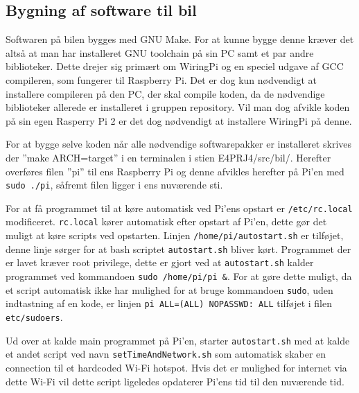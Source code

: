 \subsection{Bygning af software til bil}

Softwaren på bilen bygges med GNU Make\cite{lib:GNU_make}.
For at kunne bygge denne kræver det altså at man har installeret GNU toolchain på sin PC samt et par andre biblioteker.
Dette drejer sig primært om WiringPi\cite{lib:wiringpi} og en speciel udgave af GCC compileren, som fungerer til Raspberry Pi\cite{lib:pi_tools}.
Det er dog kun nødvendigt at installere compileren på den PC, der skal compile koden, da de nødvendige biblioteker allerede er installeret i gruppen repository. 
Vil man dog afvikle koden på sin egen Rasperry Pi 2 er det dog nødvendigt at installere WiringPi på denne.

For at bygge selve koden når alle nødvendige softwarepakker er installeret skrives der ''make ARCH=target'' i en terminalen i stien E4PRJ4/src/bil/.
Herefter overføres filen ''pi'' til ens Raspberry Pi og denne afvikles herefter på Pi'en med \texttt{sudo ./pi}, såfremt filen ligger i ens nuværende sti.

For at få programmet til at køre automatisk ved Pi'ens opstart er \texttt{/etc/rc.local} modificeret. \texttt{rc.local} kører automatisk efter opstart af Pi'en, dette gør det muligt at køre scripts ved opstarten. Linjen \texttt{/home/pi/autostart.sh} er tilføjet, denne linje sørger for at bash scriptet \texttt{autostart.sh} bliver kørt. Programmet der er lavet kræver root privilege, dette er gjort ved at \texttt{autostart.sh} kalder programmet ved kommandoen \texttt{sudo /home/pi/pi \&}.
For at gøre dette muligt, da et script automatisk ikke har mulighed for at bruge kommandoen \texttt{sudo}, uden indtastning af en kode, er linjen \texttt{pi ALL=(ALL) NOPASSWD: ALL} tilføjet i filen \texttt{etc/sudoers}.

Ud over at kalde main programmet på Pi'en, starter \texttt{autostart.sh} med at kalde et andet script ved navn \texttt{setTimeAndNetwork.sh} som automatisk skaber en connection til et hardcoded Wi-Fi hotspot. Hvis det er mulighed for internet via dette Wi-Fi vil dette script ligeledes opdaterer Pi'ens tid til den nuværende tid.